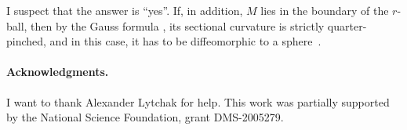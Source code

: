 \documentclass[a4paper,10pt]{article}
\begin{document}
I suspect that the answer is ``yes''.
If, in addition, $M$ lies in the boundary of the $r$-ball, then by the Gauss formula \cite[Lemma 5]{petrunin2024}, its sectional curvature is strictly quarter-pinched,
and in this case, it has to be diffeomorphic to a sphere~\cite{brendle-schoen}.

\paragraph{Acknowledgments.}
I want to thank Alexander Lytchak for help.
This work was partially supported by the National Science Foundation, grant DMS-2005279.

{\sloppy
\def\emph{\textit}
\printbibliography[heading=bibintoc]
\fussy
}
\end{document}
